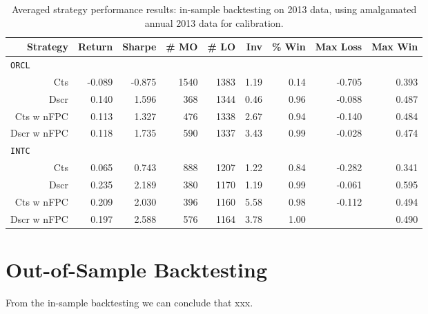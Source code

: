 \begin{table}
\centering
{}
\begin{tabular}{@{} *{9}{r} @{}}
\toprule
Strategy & Return & Sharpe & \# MO & \# LO & Inv & \% Win & Max Loss & Max Win \\
\midrule
\multicolumn{9}{l}{\texttt{ORCL}} \\ 
Cts & -0.089 & -0.875 & 1540 & 1383 & 1.19 & 0.14 & -0.705 & 0.393 \\ 
Dscr & 0.140 & 1.596 & 368 & 1344 & 0.46 & 0.96 & -0.088 & 0.487 \\ 
Cts w nFPC & 0.113 & 1.327 & 476 & 1338 & 2.67 & 0.94 & -0.140 & 0.484 \\ 
Dscr w nFPC & 0.118 & 1.735 & 590 & 1337 & 3.43 & 0.99 & -0.028 & 0.474 \\[2ex]
\multicolumn{9}{l}{\texttt{INTC}} \\ 
Cts & 0.065 & 0.743 & 888 & 1207 & 1.22 & 0.84 & -0.282 & 0.341 \\ 
Dscr & 0.235 & 2.189 & 380 & 1170 & 1.19 & 0.99 & -0.061 & 0.595 \\ 
Cts w nFPC & 0.209 & 2.030 & 396 & 1160 & 5.58 & 0.98 & -0.112 & 0.494 \\ 
Dscr w nFPC & 0.197 & 2.588 & 576 & 1164 & 3.78 & 1.00 &  & 0.490 \\ 
\bottomrule
\end{tabular}
\caption{Averaged strategy performance results: in-sample backtesting on 2013 data, using amalgamated annual 2013 data for calibration.}
\label{tbl:IS_annual}
\end{table}

\FloatBarrier
\section{Out-of-Sample Backtesting}
From the in-sample backtesting we can conclude that xxx.

